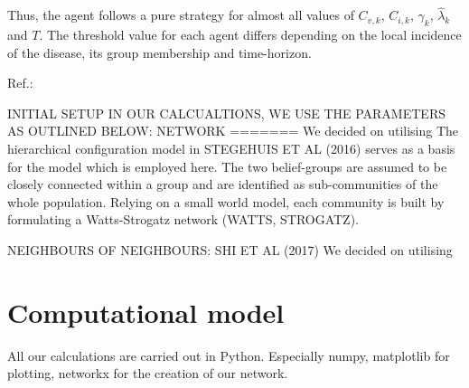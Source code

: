 \documentclass[11pt]{article}
\begin{document}
Thus, the agent follows a pure strategy for almost all values of $C_{v,k}$, $C_{i,k}$, $\gamma_{k}$, $\hat{\lambda}_{k}$ and $T$. The threshold value for each agent differs depending on the local incidence of the disease, its group membership and time-horizon.

Ref.:
\cite{shim2012}

INITIAL SETUP
IN OUR CALCUALTIONS, WE USE THE PARAMETERS AS OUTLINED BELOW:
NETWORK
=======
We decided on utilising 
The hierarchical configuration model in STEGEHUIS ET AL (2016) serves as a basis for the model which is employed here. The two belief-groups are assumed to be closely connected within a group and are identified as sub-communities of the whole population. Relying on a small world model, each community is built by formulating a Watts-Strogatz network (WATTS, STROGATZ). %

NEIGHBOURS OF NEIGHBOURS: SHI ET AL (2017)
We decided on utilising 

\section{Computational model}

All our calculations are carried out in Python. Especially numpy, matplotlib for plotting, networkx for the creation of our network. 
\end{document}
